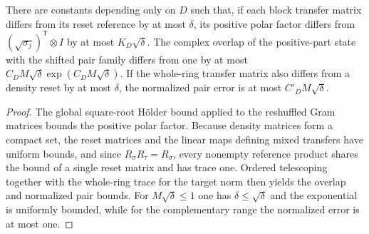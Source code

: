 \begin{lemma}
    \label{thm:ldp_varying_reference_error}
    \leanok
    There are constants depending only on $D$ such that, if each
    block transfer matrix differs from its reset reference by at most
    $\delta$, its positive polar factor differs from
    $(\sqrt{\sigma_j})^\mathsf T\otimes I$ by at most $K_D\sqrt\delta$.
    The complex overlap of the positive-part state with the shifted pair
    family differs from one by at most
    $C_DM\sqrt\delta\exp(C_DM\sqrt\delta)$.
    If the whole-ring transfer matrix also differs from a density reset
    by at most $\delta$, the normalized pair error is at most
    $C'_DM\sqrt\delta$.
\end{lemma}
\begin{proof}\leanok
    The global square-root H\"older bound applied to the reshuffled Gram
    matrices bounds the positive polar factor. Because density matrices form
    a compact set, the reset matrices and the linear maps defining mixed
    transfers have uniform bounds, and since $R_\sigma R_\tau=R_\sigma$,
    every nonempty reference product shares the bound of a single reset
    matrix and has trace one. Ordered telescoping together with the
    whole-ring trace for the target norm then yields the overlap and
    normalized pair bounds. For $M\sqrt\delta\le1$ one has
    $\delta\le\sqrt\delta$ and the exponential is uniformly bounded, while
    for the complementary range the normalized error is at most one.
\end{proof}

